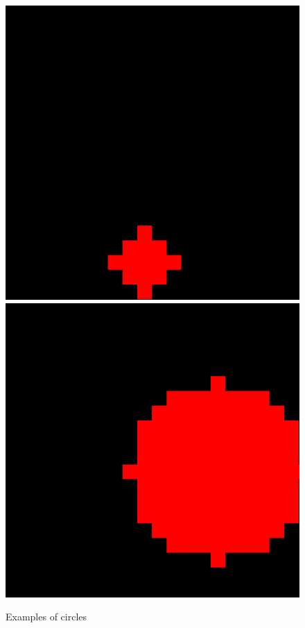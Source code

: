 \documentclass[12pt]{article}
\begin{document}
\begin{figure}[H]
  \centering
  \includegraphics[scale = 0.4]{test_circle-2.png}
  \includegraphics[scale = 0.4]{test_circle-23.png}
  \caption{Examples of circles}
\end{figure}
\end{document}
